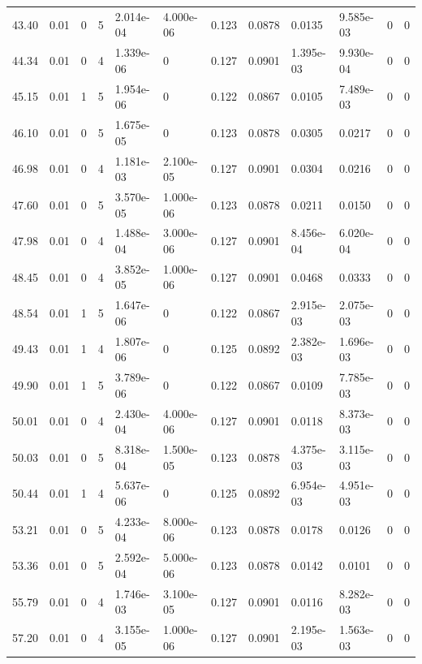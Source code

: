 \documentclass[preview]{standalone}
\begin{document}
{{{\begin{tabular}{L{1.2cm}C{1.2cm} C{0.3cm}C{0.5cm} C{1.4cm}C{1.4cm} C{1.4cm}C{1.4cm} C{1.6cm}C{1.6cm} C{1.6cm}C{1.6cm}}
  43.40  &  0.01  & 0     &  5 &  2.014e-04  & 4.000e-06  &  0.123&   0.0878& 0.0135 & 9.585e-03   &  0 & 0  \\ 
  44.34  &  0.01  & 0     &  4 &  1.339e-06  & 0  &  0.127&   0.0901& 1.395e-03 & 9.930e-04   &  0 & 0  \\ 
  45.15  &  0.01  & 1     &  5 &  1.954e-06  & 0  &  0.122&   0.0867& 0.0105 & 7.489e-03   &  0 & 0  \\ 
  46.10  &  0.01  & 0     &  5 &  1.675e-05  & 0  &  0.123&   0.0878& 0.0305 & 0.0217   &  0 & 0  \\ 
  46.98  &  0.01  & 0     &  4 &  1.181e-03  & 2.100e-05  &  0.127&   0.0901& 0.0304 & 0.0216   &  0 & 0  \\ 
  47.60  &  0.01  & 0     &  5 &  3.570e-05  & 1.000e-06  &  0.123&   0.0878& 0.0211 & 0.0150   &  0 & 0  \\ 
  47.98  &  0.01  & 0     &  4 &  1.488e-04  & 3.000e-06  &  0.127&   0.0901& 8.456e-04 & 6.020e-04   &  0 & 0  \\ 
  48.45  &  0.01  & 0     &  4 &  3.852e-05  & 1.000e-06  &  0.127&   0.0901& 0.0468 & 0.0333   &  0 & 0  \\ 
  48.54  &  0.01  & 1     &  5 &  1.647e-06  & 0  &  0.122&   0.0867& 2.915e-03 & 2.075e-03   &  0 & 0  \\ 
  49.43  &  0.01  & 1     &  4 &  1.807e-06  & 0  &  0.125&   0.0892& 2.382e-03 & 1.696e-03   &  0 & 0  \\ 
  49.90  &  0.01  & 1     &  5 &  3.789e-06  & 0  &  0.122&   0.0867& 0.0109 & 7.785e-03   &  0 & 0  \\ 
  50.01  &  0.01  & 0     &  4 &  2.430e-04  & 4.000e-06  &  0.127&   0.0901& 0.0118 & 8.373e-03   &  0 & 0  \\ 
  50.03  &  0.01  & 0     &  5 &  8.318e-04  & 1.500e-05  &  0.123&   0.0878& 4.375e-03 & 3.115e-03   &  0 & 0  \\ 
  50.44  &  0.01  & 1     &  4 &  5.637e-06  & 0  &  0.125&   0.0892& 6.954e-03 & 4.951e-03   &  0 & 0  \\ 
  53.21  &  0.01  & 0     &  5 &  4.233e-04  & 8.000e-06  &  0.123&   0.0878& 0.0178 & 0.0126   &  0 & 0  \\ 
  53.36  &  0.01  & 0     &  5 &  2.592e-04  & 5.000e-06  &  0.123&   0.0878& 0.0142 & 0.0101   &  0 & 0  \\ 
  55.79  &  0.01  & 0     &  4 &  1.746e-03  & 3.100e-05  &  0.127&   0.0901& 0.0116 & 8.282e-03   &  0 & 0  \\ 
  57.20  &  0.01  & 0     &  4 &  3.155e-05  & 1.000e-06  &  0.127&   0.0901& 2.195e-03 & 1.563e-03   &  0 & 0  \\ 

\end{tabular}}}}
\end{document}
